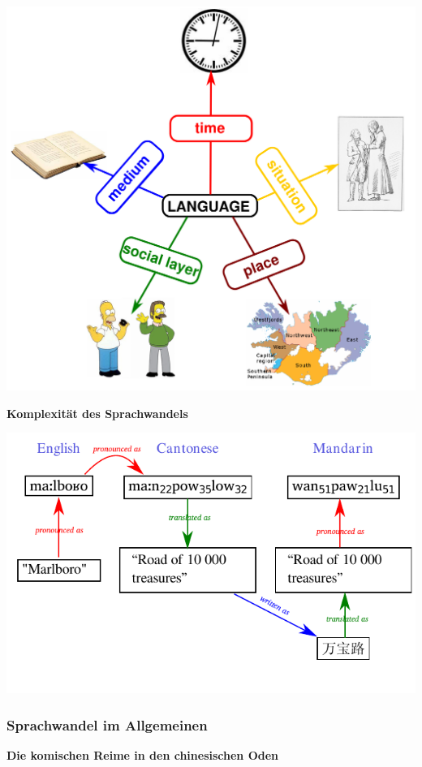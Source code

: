 \includegraphics[width=\textwidth]{img/variation-1.png}

\par\noindent\textbf{Komplexität des Sprachwandels}

\includegraphics[width=\textwidth]{img/marlboro.pdf}

\subsubsection{\texorpdfstring{{Sprachwandel im
Allgemeinen}}{Sprachwandel im Allgemeinen}}

\par\noindent\textbf{Die komischen Reime in den chinesischen Oden}

